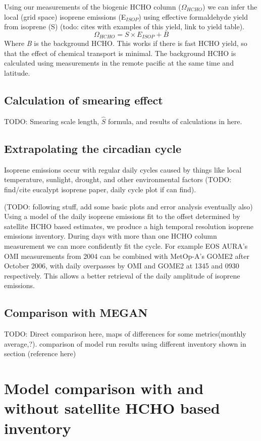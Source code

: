     Using our measurements of the biogenic HCHO column ($\Omega_{HCHO}$) we can infer the local (grid space) isoprene emissions (E$_{ISOP}$) using effective formaldehyde yield from isoprene (S) (todo: cites with examples of this yield, link to yield table).
    \begin{equation} \label{ch_isop:eqn:isop_yield}
      \Omega_{HCHO} = S \times E_{ISOP} + B
    \end{equation}
    Where \textit{B} is the background HCHO.
    This works if there is fast HCHO yield, so that the effect of chemical transport is minimal.
    The background HCHO is calculated using measurements in the remote pacific at the same time and latitude.
    
  \subsection{Calculation of smearing effect}
    TODO: Smearing scale length, $\hat{S}$ formula, and results of calculations in here.
    
    
  \subsection{Extrapolating the circadian cycle}
    Isoprene emissions occur with regular daily cycles caused by things like local temperature, sunlight, drought, and other environmental factors (TODO: find/cite eucalypt isoprene paper, daily cycle plot if can find).
    
    (TODO: following stuff, add some basic plots and error analysis eventually also)
    Using a model of the daily isoprene emissions fit to the offset determined by satellite HCHO based estimates, we produce a high temporal resolution isoprene emissions inventory.
    During days with more than one HCHO column measurement we can more confidently fit the cycle. 
    For example EOS AURA's OMI measurements from 2004 can be combined with MetOp-A's GOME2 after October 2006, with daily overpasses by OMI and GOME2 at 1345 and 0930 respectively.
    This allows a better retrieval of the daily amplitude of isoprene emissions.
    
  \subsection{Comparison with MEGAN}
    TODO: Direct comparison here, maps of differences for some metrics(monthly average,?). comparison of model run results using different inventory shown in section (reference here)

\section{Model comparison with and without satellite HCHO based inventory}


